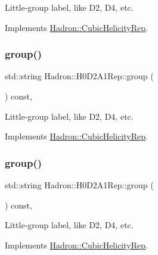 Little-\/group label, like D2, D4, etc. 

Implements \mbox{\hyperlink{structHadron_1_1CubicHelicityRep_a101a7d76cd8ccdad0f272db44b766113}{Hadron\+::\+Cubic\+Helicity\+Rep}}.

\mbox{\label{structHadron_1_1H0D2A1Rep_a2a8749e8be7f24396cd3156be2e1b037}} 
\subsubsection{\texorpdfstring{group()}{group()}\hspace{0.1cm}{\footnotesize\ttfamily [3/5]}}
{\footnotesize\ttfamily std\+::string Hadron\+::\+H0\+D2\+A1\+Rep\+::group (\begin{DoxyParamCaption}{ }\end{DoxyParamCaption}) const\hspace{0.3cm}{\ttfamily [inline]}, {\ttfamily [virtual]}}

Little-\/group label, like D2, D4, etc. 

Implements \mbox{\hyperlink{structHadron_1_1CubicHelicityRep_a101a7d76cd8ccdad0f272db44b766113}{Hadron\+::\+Cubic\+Helicity\+Rep}}.

\mbox{\label{structHadron_1_1H0D2A1Rep_a2a8749e8be7f24396cd3156be2e1b037}} 
\subsubsection{\texorpdfstring{group()}{group()}\hspace{0.1cm}{\footnotesize\ttfamily [4/5]}}
{\footnotesize\ttfamily std\+::string Hadron\+::\+H0\+D2\+A1\+Rep\+::group (\begin{DoxyParamCaption}{ }\end{DoxyParamCaption}) const\hspace{0.3cm}{\ttfamily [inline]}, {\ttfamily [virtual]}}

Little-\/group label, like D2, D4, etc. 

Implements \mbox{\hyperlink{structHadron_1_1CubicHelicityRep_a101a7d76cd8ccdad0f272db44b766113}{Hadron\+::\+Cubic\+Helicity\+Rep}}.

\mbox{\label{structHadron_1_1H0D2A1Rep_a2a8749e8be7f24396cd3156be2e1b037}} 
